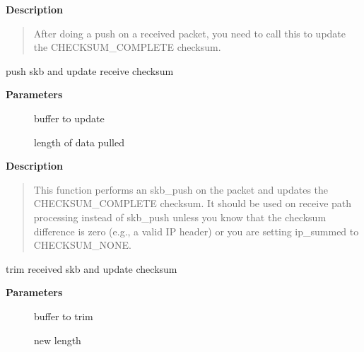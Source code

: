 \documentclass[a4paper,8pt,english]{sphinxmanual}
\begin{document}
\textbf{Description}
\begin{quote}

After doing a push on a received packet, you need to call this to
update the CHECKSUM\_COMPLETE checksum.
\end{quote}

\begin{fulllineitems}
\label{networking/kapi:c.skb_push_rcsum}
push skb and update receive checksum

\end{fulllineitems}


\textbf{Parameters}
\begin{description}
\item[{}] \leavevmode
buffer to update

\item[{}] \leavevmode
length of data pulled

\end{description}

\textbf{Description}
\begin{quote}

This function performs an skb\_push on the packet and updates
the CHECKSUM\_COMPLETE checksum.  It should be used on
receive path processing instead of skb\_push unless you know
that the checksum difference is zero (e.g., a valid IP header)
or you are setting ip\_summed to CHECKSUM\_NONE.
\end{quote}

\begin{fulllineitems}
\label{networking/kapi:c.pskb_trim_rcsum}
trim received skb and update checksum

\end{fulllineitems}


\textbf{Parameters}
\begin{description}
\item[{}] \leavevmode
buffer to trim

\item[{}] \leavevmode
new length

\end{description}
\end{document}
